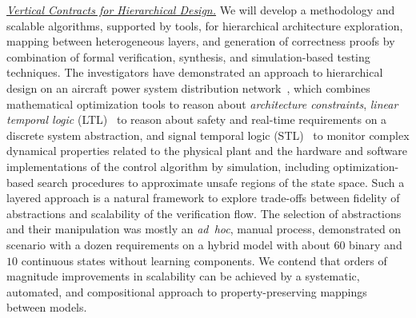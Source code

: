 \noindent \underline{\textit{Vertical Contracts for Hierarchical Design.}} 
We will develop a methodology and scalable algorithms, supported by tools, for hierarchical architecture exploration, mapping between heterogeneous layers, and generation of correctness proofs by combination of formal verification, synthesis, and simulation-based testing techniques. The investigators have demonstrated an approach to hierarchical design on an aircraft power system distribution network~\cite{Nuzzo14,Nuzzo15b}, which combines mathematical optimization tools to reason about  \emph{architecture constraints}, 
\emph{linear temporal logic} (LTL)~\cite{pnueli}
% 
to reason about safety and real-time requirements on a  discrete system abstraction, and 
signal temporal logic (STL)~\cite{MalerN04} to monitor 
complex dynamical properties related to the physical plant and the hardware and software implementations of the control algorithm by simulation, including   
optimization-based search procedures to approximate unsafe regions of the state space. 
Such a layered approach is a natural framework to explore trade-offs between fidelity of abstractions and scalability of the verification flow. The selection of abstractions and their manipulation was  mostly an \emph{ad~hoc}, manual process, demonstrated on scenario with a dozen requirements on a hybrid model with about $60$ binary and $10$ continuous states without learning components. We contend that orders of magnitude improvements in scalability can be achieved by a systematic, automated, and compositional approach to property-preserving mappings between models. 
